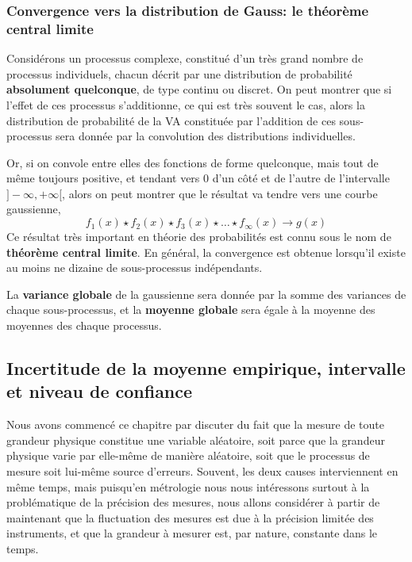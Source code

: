\documentclass[main.tex]{subfiles}
\begin{document}
\subsubsection{Convergence vers la distribution de Gauss: le théorème central limite}

Considérons un processus complexe, constitué d'un très grand nombre de processus individuels, chacun décrit par une distribution de probabilité \textbf{absolument quelconque}, de type continu ou discret. On peut montrer que si l'effet de ces processus s'additionne, ce qui est très souvent le cas, alors la distribution de probabilité de la VA constituée par l'addition de ces sous-processus sera donnée par la convolution des distributions individuelles.

Or, si on convole entre elles des fonctions de forme quelconque, mais tout de même toujours positive, et tendant vers 0 d'un côté et de l'autre de l'intervalle $]-\infty,+\infty[$, alors on peut montrer que le résultat va tendre vers une courbe gaussienne,
\begin{equation}
    f_1(x)\star f_2(x)\star f_3(x)\star\dots\star f_\infty(x)\rightarrow g(x)
\end{equation}
Ce résultat très important en théorie des probabilités est connu sous le nom de \textbf{théorème central limite}. En général, la convergence est obtenue lorsqu'il existe au moins ne dizaine de sous-processus indépendants.

La \textbf{variance globale} de la gaussienne sera donnée par la somme des variances de chaque sous-processus, et la \textbf{moyenne globale} sera égale à la moyenne des moyennes des chaque processus.

\subsection{Incertitude de la moyenne empirique, intervalle et niveau de confiance}

Nous avons commencé ce chapitre par discuter du fait que la mesure de toute grandeur physique constitue une variable aléatoire, soit parce que la grandeur physique varie par elle-même de manière aléatoire, soit que le processus de mesure soit lui-même source d'erreurs. Souvent, les deux causes interviennent en même temps, mais puisqu'en métrologie nous nous intéressons surtout à la problématique de la précision des mesures, nous allons considérer à partir de maintenant que la fluctuation des mesures est due à la précision limitée des instruments, et que la grandeur à mesurer est, par nature, constante dans le temps.
\end{document}
